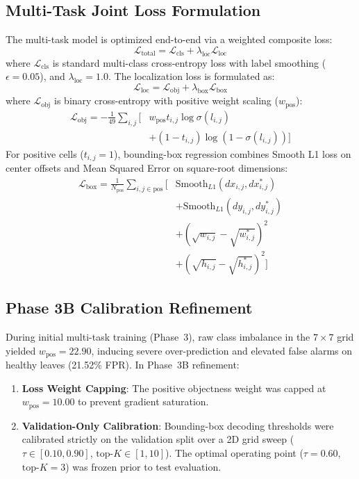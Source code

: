 \documentclass[conference]{IEEEtran}
\begin{document}
\subsection{Multi-Task Joint Loss Formulation}
The multi-task model is optimized end-to-end via a weighted composite loss:
\begin{equation}
\mathcal{L}_{\text{total}} = \mathcal{L}_{\text{cls}} + \lambda_{\text{loc}} \mathcal{L}_{\text{loc}}
\end{equation}
where $\mathcal{L}_{\text{cls}}$ is standard multi-class cross-entropy loss with label smoothing ($\epsilon = 0.05$), and $\lambda_{\text{loc}} = 1.0$. The localization loss is formulated as:
\begin{equation}
\mathcal{L}_{\text{loc}} = \mathcal{L}_{\text{obj}} + \lambda_{\text{box}} \mathcal{L}_{\text{box}}
\end{equation}
where $\mathcal{L}_{\text{obj}}$ is binary cross-entropy with positive weight scaling ($w_{\text{pos}}$):
\begin{equation}
\begin{split}
\mathcal{L}_{\text{obj}} = -\frac{1}{49} \sum_{i,j} \Big[ & w_{\text{pos}} t_{i,j} \log \sigma(l_{i,j}) \\
& + (1 - t_{i,j}) \log (1 - \sigma(l_{i,j})) \Big]
\end{split}
\end{equation}
For positive cells ($t_{i,j} = 1$), bounding-box regression combines Smooth L1 loss on center offsets and Mean Squared Error on square-root dimensions:
\begin{equation}
\begin{split}
\mathcal{L}_{\text{box}} = \frac{1}{N_{\text{pos}}} \sum_{i,j \in \text{pos}} \Big[ & \text{Smooth}_{L1}(dx_{i,j}, dx^*_{i,j}) \\
& + \text{Smooth}_{L1}(dy_{i,j}, dy^*_{i,j}) \\
& + (\sqrt{w_{i,j}} - \sqrt{w^*_{i,j}})^2 \\
& + (\sqrt{h_{i,j}} - \sqrt{h^*_{i,j}})^2 \Big]
\end{split}
\end{equation}

\subsection{Phase 3B Calibration Refinement}
During initial multi-task training (Phase~3), raw class imbalance in the $7\times 7$ grid yielded $w_{\text{pos}} = 22.90$, inducing severe over-prediction and elevated false alarms on healthy leaves (21.52\% FPR). In Phase~3B refinement:
\begin{enumerate}
    \item \textbf{Loss Weight Capping}: The positive objectness weight was capped at $w_{\text{pos}} = 10.00$ to prevent gradient saturation.
    \item \textbf{Validation-Only Calibration}: Bounding-box decoding thresholds were calibrated strictly on the validation split over a 2D grid sweep ($\tau \in [0.10, 0.90]$, $\text{top-}K \in [1, 10]$). The optimal operating point ($\tau = 0.60$, $\text{top-}K = 3$) was frozen prior to test evaluation.
\end{enumerate}
\end{document}
